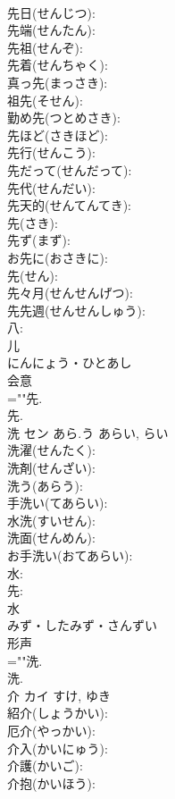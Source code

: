 \documentclass[8pt]{extreport}
\begin{document}
\begin{CJK}{UTF8}{min}
\\	先日(せんじつ): 
\\	先端(せんたん): 
\\	先祖(せんぞ): 
\\	先着(せんちゃく): 
\\	真っ先(まっさき): 
\\	祖先(そせん): 
\\	勤め先(つとめさき): 
\\	先ほど(さきほど): 
\\	先行(せんこう): 
\\	先だって(せんだって): 
\\	先代(せんだい): 
\\	先天的(せんてんてき): 
\\	先(さき): 
\\	先ず(まず): 
\\	お先に(おさきに): 
\\	先(せん): 
\\	先々月(せんせんげつ): 
\\	先先週(せんせんしゅう): 
\\	八: 
\\	儿	
\\	にんにょう・ひとあし	
\\	会意 
\\	=""先.
\\	先.
\\	洗	セン	あら.う	あらい, らい	
\\	洗濯(せんたく): 
\\	洗剤(せんざい): 
\\	洗う(あらう): 
\\	手洗い(てあらい): 
\\	水洗(すいせん): 
\\	洗面(せんめん): 
\\	お手洗い(おてあらい): 
\\	水: 
\\	先: 
\\	水	
\\	みず・したみず・さんずい	
\\	形声 
\\	=""洗.
\\	洗.
\\	介	カイ		すけ, ゆき	
\\	紹介(しょうかい): 
\\	厄介(やっかい): 
\\	介入(かいにゅう): 
\\	介護(かいご): 
\\	介抱(かいほう): 

\end{CJK}
\end{document}
